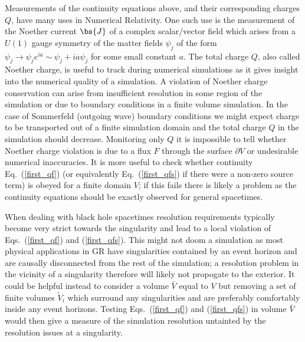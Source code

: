 Measurements of the continuity equations above, and their corresponding charges ${Q}$, have many uses in Numerical Relativity. One such use is the measurement of the Noether current $\bs{J}$ of a complex scalar/vector field which arises from a $U(1)$ gauge symmetry of the matter fields $\psi_j$ of the form $\psi_j \rightarrow \psi_j e^{ia} \sim \psi_j + i a \psi_j$ for some small constant $a$. The total charge $Q$, also called Noether charge, is useful to track during numerical simulations as it gives insight into the numerical quality of a simulation. A violation of Noether charge conservation can arise from insufficient resolution in some region of the simulation or due to boundary conditions in a finite volume simulation. In the case of Sommerfeld (outgoing wave) boundary conditions \cite{Alcubierre:2002kk} we might expect charge to be transported out of a finite simulation domain and the total charge $Q$ in the simulation should decrease. Monitoring only ${Q}$ it is impossible to tell whether Noether charge violation is due to a flux ${F}$ through the surface $\partial V$ or undesirable numerical inaccuracies. It is more useful to check whether continuity Eq.~(\ref{first_qf}) (or equivalently Eq.~(\ref{first_qfs}) if there were a non-zero source term) is obeyed for a finite domain $V$; if this fails there is likely a problem as the continuity equations should be exactly observed for general spacetimes. 

When dealing with black hole spacetimes resolution requirements typically become very strict towards the singularity and lead to a local violation of Eqs.~(\ref{first_qf}) and (\ref{first_qfs}). This might not doom a simulation as most physical applications in GR have singularities contained by an event horizon and are causally disconnected from the rest of the simulation; a resolution problem in the vicinity of a singularity therefore will likely not propogate to the exterior. It could be helpful instead to consider a volume $\bar{V}$ equal to $V$ but removing a set of finite volumes $\tilde{V}_i$ which surround any singularities and are preferably comfortably inside any event horizons. Testing Eqs.~(\ref{first_qf}) and (\ref{first_qfs}) in volume $\bar{V}$ would then give a measure of the simulation resolution untainted by the resolution issues at a singularity.

